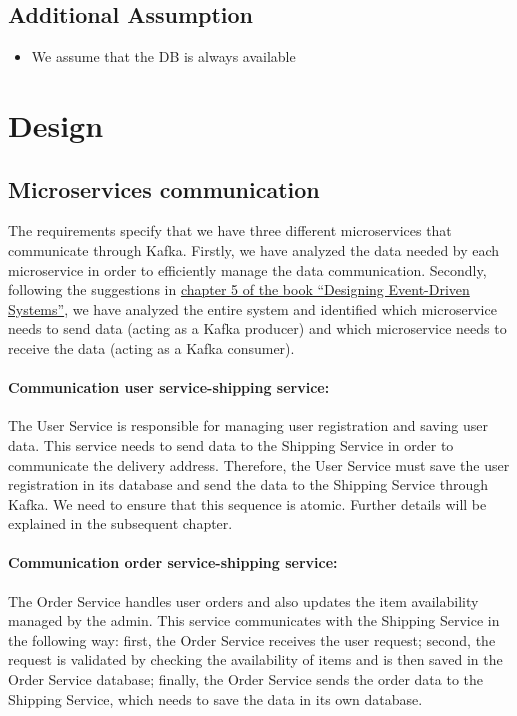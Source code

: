 \documentclass[11pt]{article}
\begin{document}
\subsection{Additional Assumption}
\begin{itemize}
    \item We assume that the DB is always available
\end{itemize}
\cleardoublepage


\section{Design}
\subsection{Microservices communication}
The requirements specify that we have three different microservices that communicate through Kafka. Firstly, we have analyzed the data needed by each microservice in order to efficiently manage the data communication. Secondly, following the suggestions in \href{https://www.confluent.io/designing-event-driven-systems/}{chapter  5 of the book “Designing Event-Driven Systems”}, we have analyzed the entire system and identified which microservice needs to send data (acting as a Kafka producer) and which microservice needs to receive the data (acting as a Kafka consumer).


\paragraph{Communication user service-shipping service:}  
The User Service is responsible for managing user registration and saving user data. This service needs to send data to the Shipping Service in order to communicate the delivery address. Therefore, the User Service must save the user registration in its database and send the data to the Shipping Service through Kafka. We need to ensure that this sequence is atomic. Further details will be explained in the subsequent chapter.

\paragraph{Communication order service-shipping service:}
The Order Service handles user orders and also updates the item availability managed by the admin. This service communicates with the Shipping Service in the following way: first, the Order Service receives the user request; second, the request is validated by checking the availability of items and is then saved in the Order Service database; finally, the Order Service sends the order data to the Shipping Service, which needs to save the data in its own database.
\end{document}

